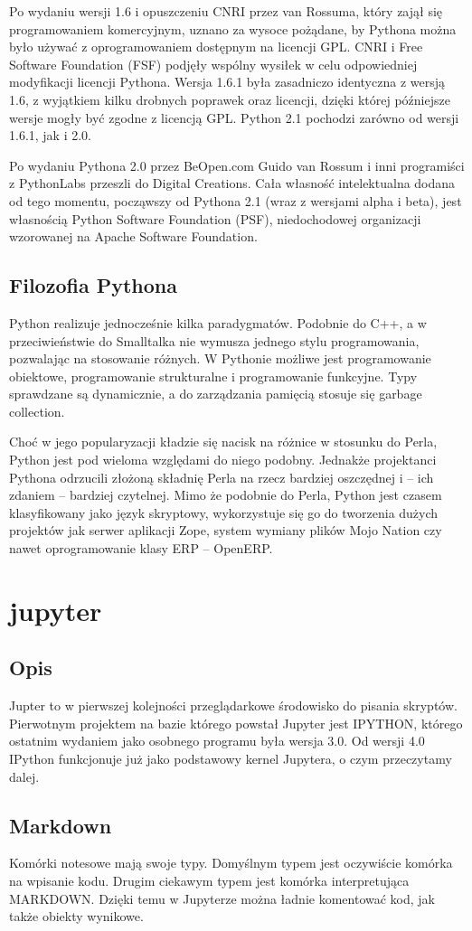 \documentclass{article}
\begin{document}
Po wydaniu wersji 1.6 i opuszczeniu CNRI przez van Rossuma, który zajął się programowaniem komercyjnym, uznano za wysoce pożądane, by Pythona można było używać z oprogramowaniem dostępnym na licencji GPL. CNRI i Free Software Foundation (FSF) podjęły wspólny wysiłek w celu odpowiedniej modyfikacji licencji Pythona. Wersja 1.6.1 była zasadniczo identyczna z wersją 1.6, z wyjątkiem kilku drobnych poprawek oraz licencji, dzięki której późniejsze wersje mogły być zgodne z licencją GPL. Python 2.1 pochodzi zarówno od wersji 1.6.1, jak i 2.0.

Po wydaniu Pythona 2.0 przez BeOpen.com Guido van Rossum i inni programiści z PythonLabs przeszli do Digital Creations. Cała własność intelektualna dodana od tego momentu, począwszy od Pythona 2.1 (wraz z wersjami alpha i beta), jest własnością Python Software Foundation (PSF), niedochodowej organizacji wzorowanej na Apache Software Foundation.
 \subsection{Filozofia Pythona} 
 Python realizuje jednocześnie kilka paradygmatów. Podobnie do C++, a w przeciwieństwie do Smalltalka nie wymusza jednego stylu programowania, pozwalając na stosowanie różnych. W Pythonie możliwe jest programowanie obiektowe, programowanie strukturalne i programowanie funkcyjne. Typy sprawdzane są dynamicznie, a do zarządzania pamięcią stosuje się garbage collection.

Choć w jego popularyzacji kładzie się nacisk na różnice w stosunku do Perla, Python jest pod wieloma względami do niego podobny. Jednakże projektanci Pythona odrzucili złożoną składnię Perla na rzecz bardziej oszczędnej i – ich zdaniem – bardziej czytelnej. Mimo że podobnie do Perla, Python jest czasem klasyfikowany jako język skryptowy, wykorzystuje się go do tworzenia dużych projektów jak serwer aplikacji Zope, system wymiany plików Mojo Nation czy nawet oprogramowanie klasy ERP – OpenERP.

\section{jupyter}
\subsection{Opis}
Jupter to w pierwszej kolejności przeglądarkowe środowisko do pisania skryptów. Pierwotnym projektem na bazie którego powstał Jupyter jest IPYTHON, którego ostatnim wydaniem jako osobnego programu była wersja 3.0. Od wersji 4.0 IPython funkcjonuje już jako podstawowy kernel Jupytera, o czym przeczytamy dalej.
\subsection{Markdown}
Komórki notesowe mają swoje typy. Domyślnym typem jest oczywiście komórka na wpisanie kodu. Drugim ciekawym typem jest komórka interpretująca MARKDOWN. Dzięki temu w Jupyterze można ładnie komentować kod, jak także obiekty wynikowe.
\end{document}

